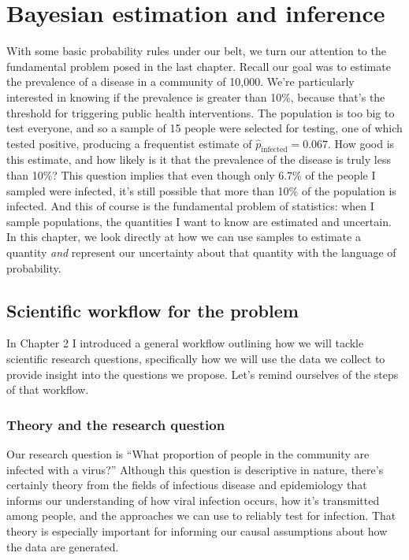 \documentclass[
]{book}
\begin{document}
\chapter{Bayesian estimation and inference}\label{bayesian-estimation-and-inference}

With some basic probability rules under our belt, we turn our attention
to the fundamental problem posed in the last chapter. Recall our goal
was to estimate the prevalence of a disease in a community of 10,000.
We're particularly interested in knowing if the prevalence is greater
than 10\%, because that's the threshold for triggering public health
interventions. The population is too big to test everyone, and so a
sample of 15 people were selected for testing, one of which tested
positive, producing a frequentist estimate of \(\hat{p}_{\text{infected}} = 0.067\). How good is this estimate, and how likely is it that the
prevalence of the disease is truly less than 10\%? This question implies
that even though only 6.7\% of the people I sampled were infected, it's
still possible that more than 10\% of the population is infected. And
this of course is the fundamental problem of statistics: when I sample
populations, the quantities I want to know are estimated and uncertain.
In this chapter, we look directly at how we can use samples to estimate
a quantity \emph{and} represent our uncertainty about that quantity with the
language of probability.

\section{Scientific workflow for the problem}\label{scientific-workflow-for-the-problem}

In Chapter 2 I introduced a general workflow outlining how we will
tackle scientific research questions, specifically how we will use the
data we collect to provide insight into the questions we propose. Let's
remind ourselves of the steps of that workflow.

\subsection{Theory and the research question}\label{theory-and-the-research-question}

Our research question is ``What proportion of people in the community are
infected with a virus?'' Although this question is descriptive in nature,
there's certainly theory from the fields of infectious disease and
epidemiology that informs our understanding of how viral infection
occurs, how it's transmitted among people, and the approaches we can use
to reliably test for infection. That theory is especially important for
informing our causal assumptions about how the data are generated.
\end{document}
